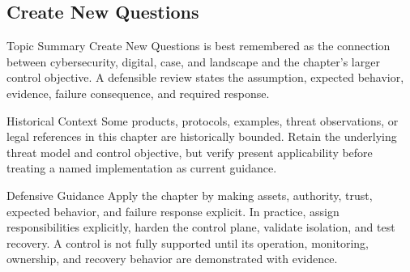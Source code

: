 \documentclass[11pt,letterpaper]{article}
\begin{document}
\subsection*{Create New Questions}
\begin{CornellNotesTable}
\end{CornellNotesTable}
\begin{CornellSummaryBox}{Topic Summary}
Create New Questions is best remembered as the connection between cybersecurity, digital, case, and landscape and the chapter's larger control objective. A defensible review states the assumption, expected behavior, evidence, failure consequence, and required response.
\end{CornellSummaryBox}
\begin{CornellWarningBox}{Historical Context}
Some products, protocols, examples, threat observations, or legal references in this chapter are historically bounded. Retain the underlying threat model and control objective, but verify present applicability before treating a named implementation as current guidance.
\end{CornellWarningBox}
\begin{CornellOverviewBox}{Defensive Guidance}
Apply the chapter by making assets, authority, trust, expected behavior, and failure response explicit. In practice, assign responsibilities explicitly, harden the control plane, validate isolation, and test recovery. A control is not fully supported until its operation, monitoring, ownership, and recovery behavior are demonstrated with evidence.
\end{CornellOverviewBox}
\end{document}
